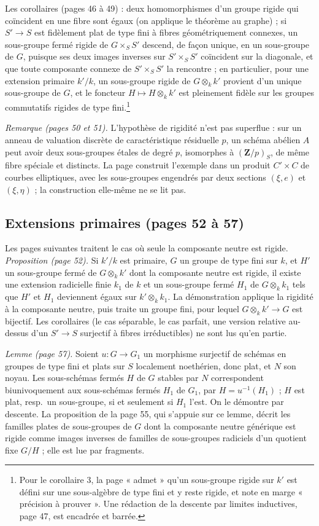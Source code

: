 \documentclass[11pt,a4paper]{article}
\begin{document}
Les corollaires (pages 46 à 49) : deux homomorphismes d'un groupe rigide qui
coïncident en une fibre sont égaux (on applique le théorème au graphe) ; si
$S' \to S$ est fidèlement plat de type fini à fibres géométriquement connexes,
un sous-groupe fermé rigide de $G \times_S S'$ descend, de façon unique, en un
sous-groupe de $G$, puisque ses deux images inverses sur $S' \times_S S'$
coïncident sur la diagonale, et que toute composante connexe de
$S' \times_S S'$ la rencontre ; en particulier, pour une extension primaire
$k'/k$, un sous-groupe rigide de $G \otimes_k k'$ provient d'un unique
sous-groupe de $G$, et le foncteur $H \mapsto H \otimes_k k'$ est pleinement
fidèle sur les groupes commutatifs rigides de type fini.\footnote{Pour le
corollaire 3, la page « admet » qu'un sous-groupe rigide sur $k'$ est défini sur
une sous-algèbre de type fini et y reste rigide, et note en marge « précision à
prouver ». Une rédaction de la descente par limites inductives, page 47, est
encadrée et barrée.}

\emph{Remarque (pages 50 et 51).} L'hypothèse de rigidité n'est pas
superflue : sur un anneau de valuation discrète de caractéristique résiduelle
$p$, un schéma abélien $A$ peut avoir deux sous-groupes étales de degré $p$,
isomorphes à $(\mathbf{Z}/p)_S$, de même fibre spéciale et distincts. La page
construit l'exemple dans un produit $C' \times C$ de courbes elliptiques, avec
les sous-groupes engendrés par deux sections $(\xi, e)$ et $(\xi, \eta)$ ; la
construction elle-même ne se lit pas.

\subsection*{Extensions primaires (pages 52 à 57)}

Les pages suivantes traitent le cas où seule la composante neutre est rigide.
\emph{Proposition (page 52).} Si $k'/k$ est primaire, $G$ un groupe de type
fini sur $k$, et $H'$ un sous-groupe fermé de $G \otimes_k k'$ dont la
composante neutre est rigide, il existe une extension radicielle finie $k_1$ de
$k$ et un sous-groupe fermé $H_1$ de $G \otimes_k k_1$ tels que $H'$ et $H_1$
deviennent égaux sur $k' \otimes_k k_1$. La démonstration applique la rigidité
à la composante neutre, puis traite un groupe fini, pour lequel
$G \otimes_k k' \to G$ est bijectif. Les corollaires (le cas séparable, le
cas parfait, une version relative au-dessus d'un $S' \to S$ surjectif à fibres
irréductibles) ne sont lus qu'en partie.

\emph{Lemme (page 57).} Soient $u \colon G \to G_1$ un morphisme surjectif de
schémas en groupes de type fini et plats sur $S$ localement noethérien, donc
plat, et $N$ son noyau. Les sous-schémas fermés $H$ de $G$ stables par $N$
correspondent biunivoquement aux sous-schémas fermés $H_1$ de $G_1$, par
$H = u^{-1}(H_1)$ ; $H$ est plat, resp.\ un sous-groupe, si et seulement si
$H_1$ l'est. On le démontre par descente. La proposition de la page 55, qui
s'appuie sur ce lemme, décrit les familles plates de sous-groupes de $G$ dont
la composante neutre générique est rigide comme images inverses de familles de
sous-groupes radiciels d'un quotient fixe $G/H$ ; elle est lue par fragments.
\end{document}
